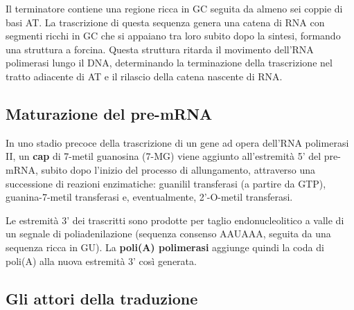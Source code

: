 Il terminatore contiene una regione ricca in GC seguita da almeno sei coppie di basi AT. La trascrizione di questa sequenza genera una catena di RNA con segmenti ricchi in GC che si appaiano tra loro subito dopo la sintesi, formando una struttura a forcina. Questa struttura ritarda il movimento dell'RNA polimerasi lungo il DNA, determinando la terminazione della trascrizione nel tratto adiacente di AT e il rilascio della catena nascente di RNA.

\subsection{Maturazione del pre-mRNA}

In uno stadio precoce della trascrizione di un gene ad opera dell'RNA polimerasi II, un \textbf{cap} di 7-metil guanosina (7-MG) viene aggiunto all'estremità 5' del pre-mRNA, subito dopo l'inizio del processo di allungamento, attraverso una successione di reazioni enzimatiche: guanilil transferasi (a partire da GTP), guanina-7-metil transferasi e, eventualmente, 2'-O-metil transferasi.

Le estremità 3' dei trascritti sono prodotte per taglio endonucleolitico a valle di un segnale di poliadenilazione (sequenza consenso AAUAAA, seguita da una sequenza ricca in GU). La \textbf{poli(A) polimerasi} aggiunge quindi la coda di poli(A) alla nuova estremità 3' così generata.

\subsection{Gli attori della traduzione}

